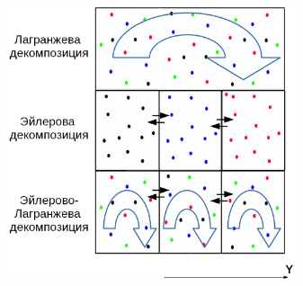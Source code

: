 \begin{figure}[]
\begin{center}
\includegraphics[height=8cm,keepaspectratio]{images/decomp_all.png}
\end{center}
\end{figure}

\clearpage

